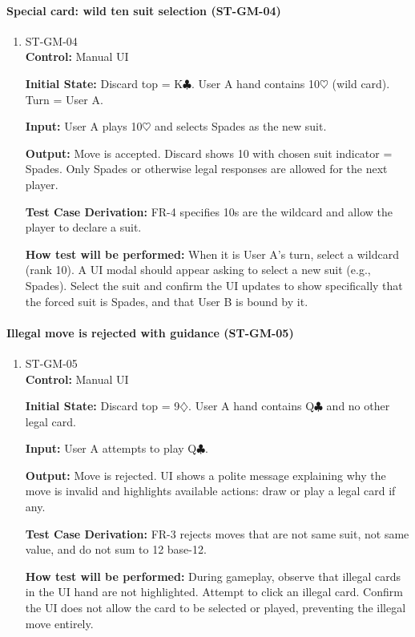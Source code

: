 \documentclass[12pt, titlepage]{article}
\begin{document}
\paragraph{Special card: wild ten suit selection (ST-GM-04)}
\begin{enumerate}
\item{ST-GM-04\\}
\textbf{Control:} Manual UI

\textbf{Initial State:} Discard top = K$\clubsuit$. User A hand contains 10$\heartsuit$ (wild card). Turn = User A.

\textbf{Input:} User A plays 10$\heartsuit$ and selects Spades as the new suit.

\textbf{Output:} Move is accepted. Discard shows 10 with chosen suit indicator = Spades. Only Spades or otherwise legal responses are allowed for the next player.

\textbf{Test Case Derivation:} FR-4 specifies 10s are the wildcard and allow the player to declare a suit.

\textbf{How test will be performed:} When it is User A's turn, select a wildcard (rank 10). A UI modal should appear asking to select a new suit (e.g., Spades). Select the suit and confirm the UI updates to show specifically that the forced suit is Spades, and that User B is bound by it.
\end{enumerate}

\paragraph{Illegal move is rejected with guidance (ST-GM-05)}
\begin{enumerate}
\item{ST-GM-05\\}
\textbf{Control:} Manual UI

\textbf{Initial State:} Discard top = 9$\diamondsuit$. User A hand contains Q$\clubsuit$ and no other legal card.

\textbf{Input:} User A attempts to play Q$\clubsuit$.

\textbf{Output:} Move is rejected. UI shows a polite message explaining why the move is invalid and highlights available actions: draw or play a legal card if any.

\textbf{Test Case Derivation:} FR-3 rejects moves that are not same suit, not same value, and do not sum to 12 base-12.

\textbf{How test will be performed:} During gameplay, observe that illegal cards in the UI hand are not highlighted. Attempt to click an illegal card. Confirm the UI does not allow the card to be selected or played, preventing the illegal move entirely.
\end{enumerate}
\end{document}
